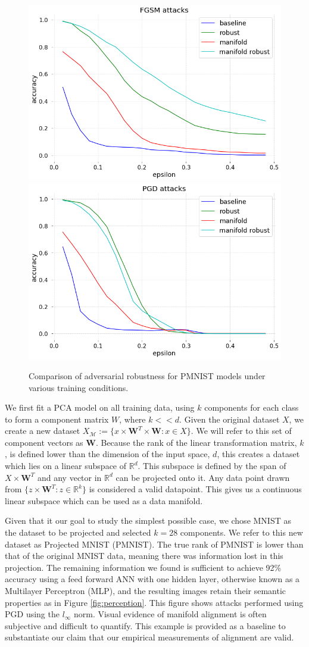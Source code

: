 \begin{figure}[ht]
    \centering
    \includegraphics[width=0.45\linewidth]{c3_figures/FGSM_attacks_accuracy_known_manifold.png}\includegraphics[width=0.45\linewidth]{c3_figures/PGD_attacks_accuracy_known_manifold.png}
    \caption{Comparison of adversarial robustness for PMNIST models under various training conditions.}
    \label{fig:model_robustness}
\end{figure}

We first fit a PCA model on all training data, using $k$ components
for each class to form a component matrix $W$, where $k << d$.
Given the original dataset $X$, we create a new dataset $X_{\mathcal{M}} := \{x \times \textbf{W}^T \times \textbf{W} : x \in X \}$.
We will refer to this set of component vectors as $\textbf{W}$.
Because the rank of the linear transformation matrix, $k$, is defined lower than the dimension of the input space, $d$, this creates a dataset which lies on a linear subspace of $\mathds{R}^d$.
This subspace is defined by the span of $X \times \textbf{W}^T$ and any vector in $\mathds{R}^d$ can be projected onto it.
Any data point drawn from $\{z \times \textbf{W}^T : z \in \mathds{R}^k \}$ is considered a valid datapoint.
This gives us a continuous linear subspace which can be used as a data manifold.

Given that it our goal to study the simplest possible case, we chose MNIST as the dataset to be projected and selected $k = 28$ components.
We refer to this new dataset as Projected MNIST (PMNIST).
The true rank of PMNIST is lower than that of the original MNIST data, meaning there was information lost in this projection.
The remaining information we found is sufficient to achieve 92\% accuracy using a feed forward ANN with one hidden layer, otherwise known as a Multilayer Perceptron (MLP), and the resulting images retain their semantic properties as in Figure \ref{fig:perception}. This figure shows attacks performed using PGD using the $l_\infty$ norm. Visual evidence of manifold alignment is often subjective and difficult to quantify. This example is provided as a baseline to substantiate our claim that our empirical measurements of alignment are valid.

